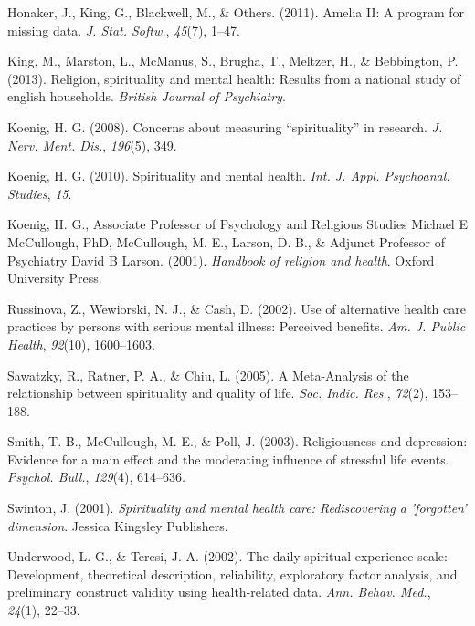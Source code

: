 \documentclass[
  english,
  man]{apa6}
\begin{document}
\leavevmode\hypertarget{ref-Honaker2011-yu}{}%
Honaker, J., King, G., Blackwell, M., \& Others. (2011). Amelia II: A program for missing data. \emph{J. Stat. Softw.}, \emph{45}(7), 1--47.

\leavevmode\hypertarget{ref-King2013-cg}{}%
King, M., Marston, L., McManus, S., Brugha, T., Meltzer, H., \& Bebbington, P. (2013). Religion, spirituality and mental health: Results from a national study of english households. \emph{British Journal of Psychiatry}.

\leavevmode\hypertarget{ref-Koenig2008-lv}{}%
Koenig, H. G. (2008). Concerns about measuring ``spirituality'' in research. \emph{J. Nerv. Ment. Dis.}, \emph{196}(5), 349.

\leavevmode\hypertarget{ref-Koenig2010-gk}{}%
Koenig, H. G. (2010). Spirituality and mental health. \emph{Int. J. Appl. Psychoanal. Studies}, \emph{15}.

\leavevmode\hypertarget{ref-Koenig2001-ow}{}%
Koenig, H. G., Associate Professor of Psychology and Religious Studies Michael E McCullough, PhD, McCullough, M. E., Larson, D. B., \& Adjunct Professor of Psychiatry David B Larson. (2001). \emph{Handbook of religion and health}. Oxford University Press.

\leavevmode\hypertarget{ref-Russinova2002-rq}{}%
Russinova, Z., Wewiorski, N. J., \& Cash, D. (2002). Use of alternative health care practices by persons with serious mental illness: Perceived benefits. \emph{Am. J. Public Health}, \emph{92}(10), 1600--1603.

\leavevmode\hypertarget{ref-Sawatzky2005-rw}{}%
Sawatzky, R., Ratner, P. A., \& Chiu, L. (2005). A Meta-Analysis of the relationship between spirituality and quality of life. \emph{Soc. Indic. Res.}, \emph{72}(2), 153--188.

\leavevmode\hypertarget{ref-Smith2003-re}{}%
Smith, T. B., McCullough, M. E., \& Poll, J. (2003). Religiousness and depression: Evidence for a main effect and the moderating influence of stressful life events. \emph{Psychol. Bull.}, \emph{129}(4), 614--636.

\leavevmode\hypertarget{ref-Swinton2001-vr}{}%
Swinton, J. (2001). \emph{Spirituality and mental health care: Rediscovering a 'forgotten' dimension}. Jessica Kingsley Publishers.

\leavevmode\hypertarget{ref-Underwood2002-hg}{}%
Underwood, L. G., \& Teresi, J. A. (2002). The daily spiritual experience scale: Development, theoretical description, reliability, exploratory factor analysis, and preliminary construct validity using health-related data. \emph{Ann. Behav. Med.}, \emph{24}(1), 22--33.
\end{document}
